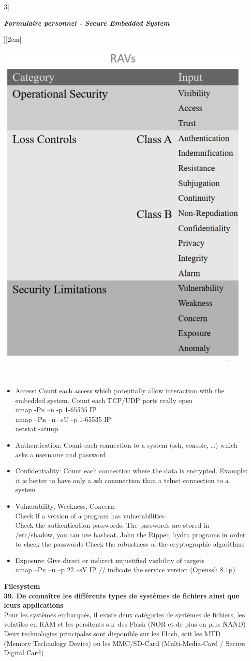 \begin{multicols}{3}[\centerline{ \large\em \textbf{Formulaire personnel - Secure Embedded System}}][2cm]
\begin{minipage}{\linewidth}
    \includegraphics[width =0.4\columnwidth]{images/24.png}
\end{minipage}\\
\begin{itemize}
\item Access: Count each access which potentially allow interaction with the embedded system. Count each TCP/UDP ports really open\\
nmap -Pn –n -p 1-65535 IP\\
nmap –Pn –n –sU -p 1-65535 IP\\
netstat -atunp
\item Authentication: Count each connection to a system (ssh, console, …) which asks a username and password
\item Confidentiality: Count each connection where the data is encrypted. Example: it is better to have only a ssh connnection than a telnet connection to a system
\item Vulnerability, Weekness, Concern:\\
Check if a version of a program has vulnerabilities\\
Check the authentication passwords. The passwords are stored in /etc/shadow,
you can use hashcat, John the Ripper, hydra programs in order to check the
passwords
Check the robustness of the cryptographic algorithms
\item Exposure: Give direct or indirect unjustified visibility of targets\\
nmap –Pn –n –p 22 –sV IP // indicate the service version
(Openssh 8.1p)
\end{itemize}
\newpage
{\Large \textbf{Filesystem}}
\\ \textbf{39. De connaître les différents types de systèmes de fichiers ainsi que leurs applications\\}
Pour les systèmes embarqués, il existe deux catégories de systèmes de fichiers, les volatiles en RAM et les persitents sur des Flash (NOR et de plus en plus NAND)\\
Deux technologies principales sont disponible sur les Flash, soit les MTD (Memory Technology Device) ou les MMC/SD-Card (Multi-Media-Card / Secure Digital Card)\\


\end{multicols}
